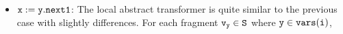 \begin{itemize}
%
%
%
	
	
\item ${\tt x := y.next1}$: The local abstract transformer is quite similar to the previous case with slightly differences. For each fragment $\tt v_y \in S$ where $\tt y \in {\tt vars}(\tt i)$,
%
%
%
%
%

\end{itemize}
